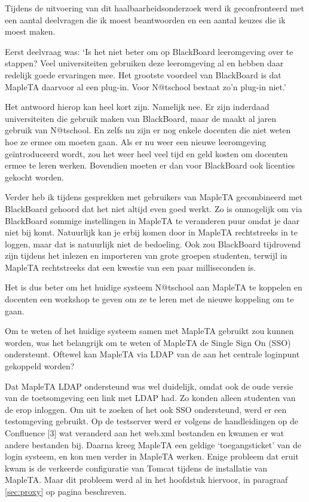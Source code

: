 
Tijdens de uitvoering van dit haalbaarheidsonderzoek werd ik
geconfronteerd met een aantal deelvragen die ik moest beantwoorden en
een aantal keuzes die ik moest maken.


Eerst deelvraag was: `Is het niet beter om op BlackBoard leeromgeving
over te stappen? Veel universiteiten gebruiken deze leeromgeving al en
hebben daar redelijk goede ervaringen mee. Het grootste voordeel van
BlackBoard is dat MapleTA daarvoor al een plug-in. Voor N@tschool
bestaat zo'n plug-in niet.'

Het antwoord hierop kan heel kort zijn. Namelijk nee. Er zijn
inderdaad universiteiten die gebruik maken van BlackBoard, maar de \HR{}
maakt al jaren gebruik van N@tschool. En zelfs nu zijn er nog enkele
docenten die niet weten hoe ze ermee om moeten gaan. Als er nu weer
een nieuwe leeromgeving geïntroduceerd wordt, zou het weer heel veel
tijd en geld kosten om docenten ermee te leren werken. Bovendien
moeten er dan voor BlackBoard ook licenties gekocht worden.

Verder heb ik tijdens gesprekken met gebruikers van MapleTA
gecombineerd met BlackBoard gehoord dat het niet altijd even goed
werkt. Zo is onmogelijk om via BlackBoard sommige instellingen in
MapleTA te veranderen puur omdat je daar niet bij komt. Natuurlijk kan
je erbij komen door in MapleTA rechtstreeks in te loggen, maar dat is
natuurlijk niet de bedoeling. Ook zou BlackBoard tijdrovend zijn
tijdens het inlezen en importeren van grote groepen studenten, terwijl
in MapleTA rechtstreeks dat een kwestie van een paar milliseconden is.

Het is dus beter om het huidige systeem N@tschool aan MapleTA
te koppelen en docenten een workshop te geven om ze te leren met de
nieuwe koppeling om te gaan.


Om te weten of het huidige systeem samen met MapleTA gebruikt zou
kunnen worden, was het belangrijk om te weten of MapleTA de Single
Sign On (SSO) ondersteunt. Oftewel kan MapleTA via LDAP van de \HR{} aan
het centrale loginpunt gekoppeld worden?

Dat MapleTA LDAP ondersteund was wel duidelijk, omdat ook de oude
versie van de toetsomgeving een link met LDAP had. Zo konden alleen
studenten van de \HR{} erop inloggen. Om uit te zoeken of het ook SSO
ondersteund, werd er een testomgeving gebruikt. Op de testserver werd
er volgens de handleidingen op de Confluence [3] wat veranderd aan het
web.xml bestanden en kwamen er wat andere bestanden bij. Daarna kreeg
MapleTA een geldige `toegangsticket' van de login systeem, en kon men
verder in MapleTA werken. Enige probleem dat eruit kwam is de
verkeerde configuratie van Tomcat tijdens de installatie van
MapleTA. Maar dit probleem werd al in het hoofdstuk hiervoor, in
paragraaf \ref{sec:proxy} op pagina \pageref{sec:proxy} beschreven.

